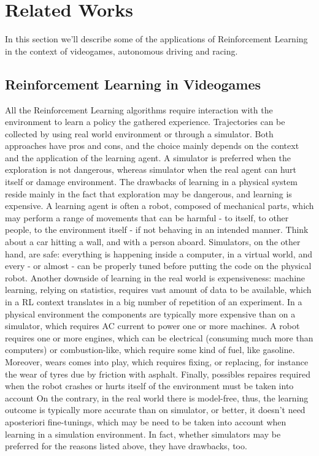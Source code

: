 \section{Related Works}



In this section we'll describe some of the applications of Reinforcement Learning in the context of videogames, autonomous driving and racing. 


\subsection{Reinforcement Learning in Videogames}

All the Reinforcement Learning algorithms require interaction with the environment to learn a policy the gathered experience. Trajectories can be collected by using real world environment or through a simulator. 
Both approaches have pros and cons, and the choice mainly depends on the context and the application of the learning agent. 
A simulator is preferred when the exploration is not dangerous, whereas simulator when the real agent can hurt itself or damage environment. 
The drawbacks of learning in a physical system reside mainly in the fact that exploration may be dangerous, and learning is expensive. A learning agent is often a robot, composed of mechanical parts, which may perform a range of movements that can be harmful - to itself, to other people, to the environment itself - if not behaving in an intended manner. Think about a car hitting a wall, and with a person aboard. Simulators, on the other hand, are safe: everything is happening inside a computer, in a virtual world, and every - or almost - can be properly tuned before putting the code on the physical robot. Another downside of learning in the real world is expensiveness: machine learning, relying on statistics, requires vast amount of data to be available, which in a RL context translates in a big number of repetition of an experiment. In a physical environment the components are typically more expensive than on a simulator, which requires AC current to power one or more machines. A robot requires one or more engines, which can be electrical (consuming much more than computers) or combustion-like, which require some kind of fuel, like gasoline. Moreover, wears comes into play, which requires fixing, or replacing, for instance the wear of tyres due by friction with asphalt. Finally, possibles repaires required when the robot crashes or hurts itself of the environment must be taken into account
On the contrary, in the real world there is model-free, thus, the learning outcome is typically more accurate than on simulator, or better, it doesn't need aposteriori fine-tunings, which may be need to be taken into account when learning in a simulation environment. In fact, whether simulators may be preferred for the reasons listed above, they have drawbacks, too.
